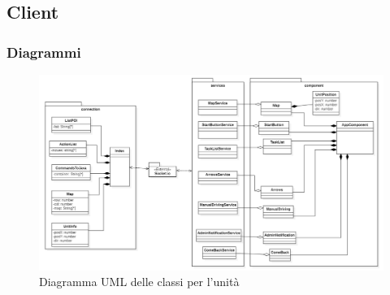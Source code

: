 \subsection{Client}
\subsubsection{Diagrammi }

\begin{figure}[H]
	\centering
	\includegraphics[scale=0.20]{res/images/UML_operatore.png}
	\caption{Diagramma UML delle classi per l'unità}
\end{figure}



